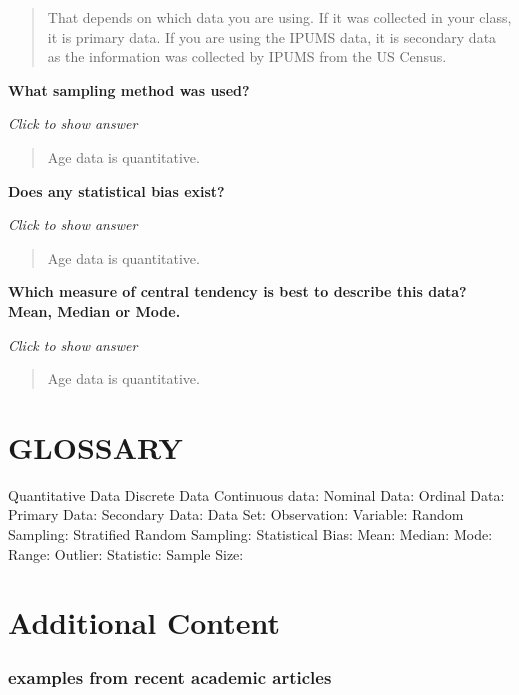 \documentclass[
]{book}
\begin{document}
\begin{quote}
That depends on which data you are using. If it was collected in your class, it is primary data. If you are using the IPUMS data, it is secondary data as the information was collected by IPUMS from the US Census.
\end{quote}

\textbf{What sampling method was used?}

\emph{Click to show answer}

\begin{quote}
Age data is quantitative.
\end{quote}

\textbf{Does any statistical bias exist?}

\emph{Click to show answer}

\begin{quote}
Age data is quantitative.
\end{quote}

\textbf{Which measure of central tendency is best to describe this data? Mean, Median or Mode.}

\emph{Click to show answer}

\begin{quote}
Age data is quantitative.
\end{quote}

\hypertarget{glossary}{%
\section{GLOSSARY}\label{glossary}}

Quantitative Data
Discrete Data
Continuous data:
Nominal Data:
Ordinal Data:
Primary Data:
Secondary Data:
Data Set:
Observation:
Variable:
Random Sampling:
Stratified Random Sampling:
Statistical Bias:
Mean:
Median:
Mode:
Range:
Outlier:
Statistic:
Sample Size:

\hypertarget{additional-content}{%
\section{Additional Content}\label{additional-content}}

\hypertarget{examples-from-recent-academic-articles}{%
\subsubsection{examples from recent academic articles}\label{examples-from-recent-academic-articles}}
\end{document}
